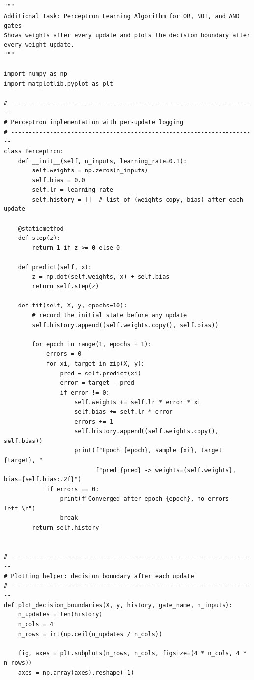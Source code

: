 \begin{verbatim}
"""
Additional Task: Perceptron Learning Algorithm for OR, NOT, and AND gates
Shows weights after every update and plots the decision boundary after
every weight update.
"""

import numpy as np
import matplotlib.pyplot as plt

# ----------------------------------------------------------------------
# Perceptron implementation with per-update logging
# ----------------------------------------------------------------------
class Perceptron:
    def __init__(self, n_inputs, learning_rate=0.1):
        self.weights = np.zeros(n_inputs)
        self.bias = 0.0
        self.lr = learning_rate
        self.history = []  # list of (weights copy, bias) after each update

    @staticmethod
    def step(z):
        return 1 if z >= 0 else 0

    def predict(self, x):
        z = np.dot(self.weights, x) + self.bias
        return self.step(z)

    def fit(self, X, y, epochs=10):
        # record the initial state before any update
        self.history.append((self.weights.copy(), self.bias))

        for epoch in range(1, epochs + 1):
            errors = 0
            for xi, target in zip(X, y):
                pred = self.predict(xi)
                error = target - pred
                if error != 0:
                    self.weights += self.lr * error * xi
                    self.bias += self.lr * error
                    errors += 1
                    self.history.append((self.weights.copy(), self.bias))
                    print(f"Epoch {epoch}, sample {xi}, target {target}, "
                          f"pred {pred} -> weights={self.weights}, bias={self.bias:.2f}")
            if errors == 0:
                print(f"Converged after epoch {epoch}, no errors left.\n")
                break
        return self.history


# ----------------------------------------------------------------------
# Plotting helper: decision boundary after each update
# ----------------------------------------------------------------------
def plot_decision_boundaries(X, y, history, gate_name, n_inputs):
    n_updates = len(history)
    n_cols = 4
    n_rows = int(np.ceil(n_updates / n_cols))

    fig, axes = plt.subplots(n_rows, n_cols, figsize=(4 * n_cols, 4 * n_rows))
    axes = np.array(axes).reshape(-1)


\end{verbatim}

